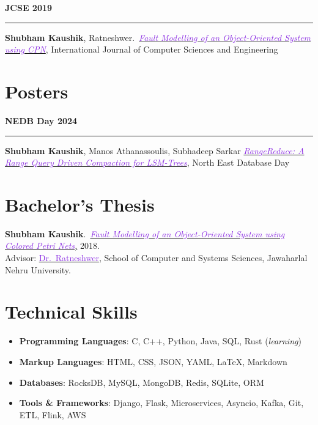 \documentclass[10pt,a4paper,calibri]{moderncv}
\newcommand{\beforesection}{\vspace{-0.5em}}
\newcommand{\mediumspace}{\vspace{0.5em}}
\newcommand{\publications}[2]{
  \noindent
  \begin{minipage}[c]{0.15\textwidth}
    \centering
      \textbf{#1}
  \end{minipage}%
  \hspace{0.01\textwidth}
  \begin{minipage}[c]{0.02\textwidth}
    \textcolor{lightgray}{\rule{1pt}{0.75cm}}
  \end{minipage}%
  \begin{minipage}[c]{0.80\textwidth}
    \raggedright{
    #2
    }
  \end{minipage}%
}
\begin{document}
\mediumspace

\publications{JCSE 2019}{\textbf{Shubham Kaushik}, Ratneshwer.\ \href{https://doi.org/10.26438/ijcse/v7i5.18281845}{\textit{\textcolor{blueviolet}{Fault 
Modelling of an Object-Oriented System using CPN}}}, International Journal of Computer Sciences and Engineering}

\mediumspace
\beforesection

\section{Posters}
\publications{NEDB Day 2024}{\textbf{Shubham Kaushik}, Manos Athanassoulis, Subhadeep Sarkar \href{https://bu-disc.github.io/nedbday/2024/download/posters/RangeReduce_A_Range_Query_Driven_Compaction_for_LSM-Trees.pdf}{\textit{\textcolor{blueviolet}{RangeReduce: A Range Query Driven Compaction for LSM-Trees}}}, North East Database Day}

\beforesection

\section{Bachelor's Thesis}
\textbf{Shubham Kaushik}.\ \href{https://doi.org/10.26438/ijcse/v7i5.18281845}
{\textit{\textcolor{blueviolet}{Fault Modelling of an Object-Oriented System using Colored Petri Nets},}} 2018.\\
Advisor: \href{https://www.jnu.ac.in/content/ratnesh}{\textcolor{blueviolet}{Dr.\ Ratneshwer}}, 
School of Computer and Systems Sciences, Jawaharlal Nehru University.



\beforesection

\section{Technical Skills}
\begin{itemize}\setlength\itemsep{0.2em}
  \item \textbf{Programming Languages}: C, C++, Python, Java, SQL, Rust (\textit{learning})
  \item \textbf{Markup Languages}: HTML, CSS, JSON, YAML, \LaTeX, Markdown
  \item \textbf{Databases}: RocksDB, MySQL, MongoDB, Redis, SQLite, ORM
  \item \textbf{Tools \& Frameworks}: Django, Flask, Microservices, Asyncio, Kafka, Git, ETL, Flink, AWS
\end{itemize}
\end{document}
